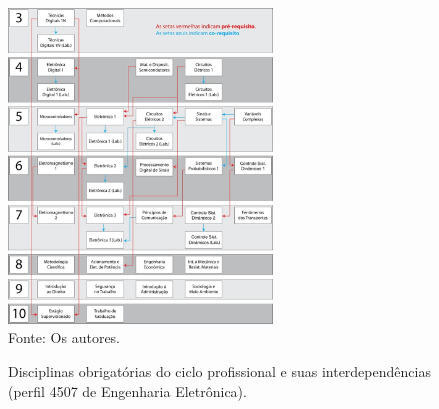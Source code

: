 \begin{figure}[h!]
	\caption{Disciplinas obrigatórias do ciclo profissional e suas interdependências (perfil 4507 de Engenharia Eletrônica).}
	\begin{center}
		\includegraphics[width=7cm]{Ilustrações/Figura 04.jpg}\\
		{\footnotesize Fonte: Os autores.}
		\label{3.2b.eps}
	\end{center}
\end{figure}